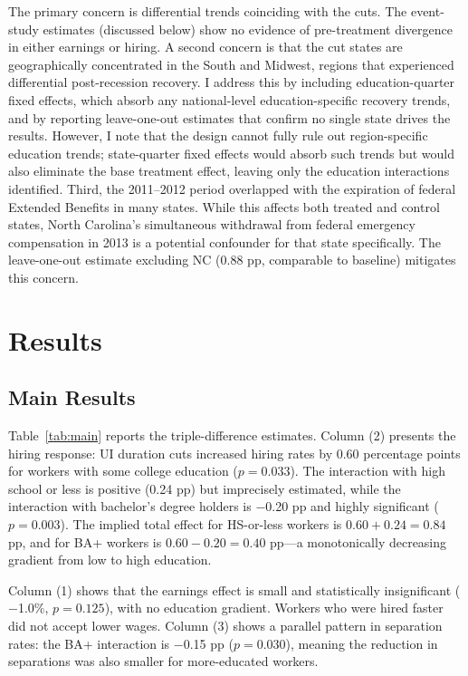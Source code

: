 \documentclass[12pt]{article}
\begin{document}
The primary concern is differential trends coinciding with the cuts. The event-study estimates (discussed below) show no evidence of pre-treatment divergence in either earnings or hiring. A second concern is that the cut states are geographically concentrated in the South and Midwest, regions that experienced differential post-recession recovery. I address this by including education-quarter fixed effects, which absorb any national-level education-specific recovery trends, and by reporting leave-one-out estimates that confirm no single state drives the results. However, I note that the design cannot fully rule out region-specific education trends; state-quarter fixed effects would absorb such trends but would also eliminate the base treatment effect, leaving only the education interactions identified. Third, the 2011--2012 period overlapped with the expiration of federal Extended Benefits in many states. While this affects both treated and control states, North Carolina's simultaneous withdrawal from federal emergency compensation in 2013 is a potential confounder for that state specifically. The leave-one-out estimate excluding NC (0.88 pp, comparable to baseline) mitigates this concern.


\section{Results}

\subsection{Main Results}



Table~\ref{tab:main} reports the triple-difference estimates. Column (2) presents the hiring response: UI duration cuts increased hiring rates by 0.60 percentage points for workers with some college education ($p = 0.033$). The interaction with high school or less is positive (0.24 pp) but imprecisely estimated, while the interaction with bachelor's degree holders is $-$0.20 pp and highly significant ($p = 0.003$). The implied total effect for HS-or-less workers is $0.60 + 0.24 = 0.84$ pp, and for BA+ workers is $0.60 - 0.20 = 0.40$ pp---a monotonically decreasing gradient from low to high education.

Column (1) shows that the earnings effect is small and statistically insignificant ($-$1.0\%, $p = 0.125$), with no education gradient. Workers who were hired faster did not accept lower wages. Column (3) shows a parallel pattern in separation rates: the BA+ interaction is $-$0.15 pp ($p = 0.030$), meaning the reduction in separations was also smaller for more-educated workers.
\end{document}
